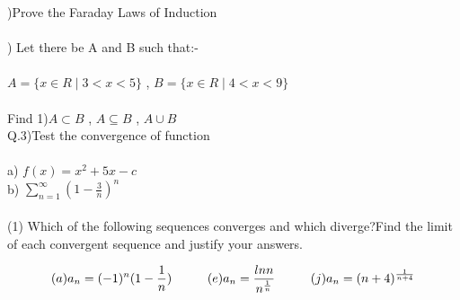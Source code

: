 \documentclass[12pt,a4paper]{article}
\begin{document}
)Prove the Faraday Laws of Induction\\
\vspace{1mm}
\\
) Let there be A and B such that:-\\
\\
\indent  $A=\{ x \in R \mid  3<x<5\}$ , $B=\{ x \in R \mid  4<x<9\}$\\
\vspace{1mm}\\
\noindent Find 1)\(A \subset B\) , \(A \subseteq B\) , \(A \cup B\)
\\
\vspace{2mm}
\newpage
\noindent Q.3)Test the convergence of function
\\
\vspace{1mm}
\\
a) \(\displaystyle f(x)=x^2+5x-c\)\\

b)\hspace{1mm} \(\displaystyle \sum_{n=1}^{\infty}(1-\frac{3}{n})^n\)\\
\vspace{3mm}
\\
\noindent (1) Which of the following sequences converges and which diverge?Find the limit of each convergent sequence and justify your answers.

\begin{equation*}
(a) a_n=(-1)^n(1-\frac{1}{n})
\hspace{1cm}
(e) a_n=\frac{ln n}{n^\frac{1}{n}}\hspace{1cm} 
(j)a_n=(n+4)^\frac{1}{n+4}\\
\\  
\end{equation*}
\end{document}
